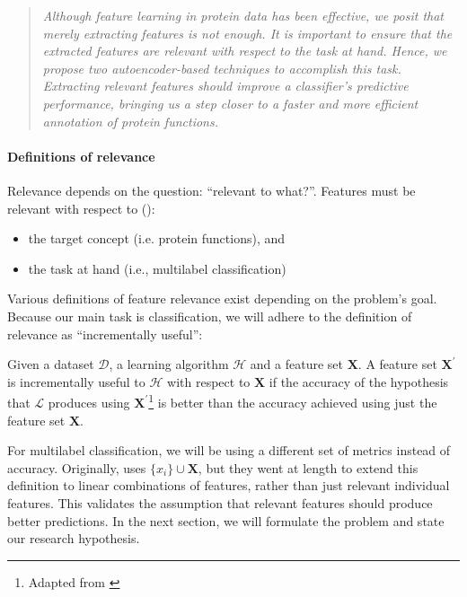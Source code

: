 \begin{quote}
  \itshape
  \small
  Although feature learning in protein data has been effective, we posit that
  merely extracting features is not enough. It is important to ensure that
  the extracted features are relevant with respect to the task at hand.
  Hence, we propose two autoencoder-based techniques to accomplish this task.
  Extracting relevant features should improve a classifier's predictive
  performance, bringing us a step closer to a faster and more efficient
  annotation of protein functions.
\end{quote}

\paragraph{Definitions of relevance}
Relevance depends on the question: ``relevant to what?''. Features must be
relevant with respect to (\cite{blum1997selection}):
\begin{itemize}
  \item the target concept (i.e. protein functions), and
  \item the task at hand (i.e., multilabel classification)
\end{itemize}

\par Various definitions of feature relevance exist depending on the
problem's goal. Because our main task is classification, we will adhere to
the definition of relevance as ``incrementally useful'':

\begin{definition}
  \label{DefRelevance}
   Given a dataset $\mathcal{D}$, a learning algorithm $\mathcal{H}$ and a
   feature set $\mathbf{X}$. A feature set $\mathbf{X}^{\prime}$ is
   incrementally useful to $\mathcal{H}$ with respect to $\mathbf{X}$ if the
   accuracy of the hypothesis that $\mathcal{L}$ produces using
   $\mathbf{X}^{\prime}$\footnote{Adapted from \cite{blum1997selection}}
   is better than the accuracy achieved using just the
   feature set $\mathbf{X}$.
\end{definition}

\par\noindent For multilabel classification, we will be using a different set
of metrics instead of accuracy. Originally, \cite{blum1997selection} uses
$\{x_{i}\} \cup \mathbf{X}$, but they went at length to extend this
definition to linear combinations of features, rather than just relevant
individual features. This validates the assumption that relevant features
should produce better predictions. In the next section, we will formulate the
problem and state our research hypothesis.

